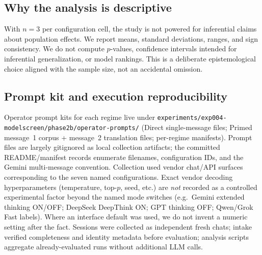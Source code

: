 \subsection{Why the analysis is descriptive}
With $n{=}3$ per configuration cell, the study is not powered for inferential claims about population effects.
We report means, standard deviations, ranges, and sign consistency.
We do not compute $p$-values, confidence intervals intended for inferential generalization, or model rankings.
This is a deliberate epistemological choice aligned with the sample size, not an accidental omission.



\subsection{Prompt kit and execution reproducibility}
Operator prompt kits for each regime live under
\texttt{experiments/exp004-modelscreen/phase2b/operator-prompts/}
(Direct single-message files; Primed message~1 corpus + message~2 translation files; per-regime manifests).
Prompt files are largely gitignored as local collection artifacts; the committed README/manifest records enumerate filenames, configuration IDs, and the Gemini multi-message convention.
Collection used vendor chat/API surfaces corresponding to the seven named configurations.
Exact vendor decoding hyperparameters (temperature, top-$p$, seed, etc.) are \emph{not} recorded as a controlled experimental factor beyond the named mode switches (e.g.\ Gemini extended thinking ON/OFF; DeepSeek DeepThink ON; GPT thinking OFF; Qwen/Grok Fast labels).
Where an interface default was used, we do not invent a numeric setting after the fact.
Sessions were collected as independent fresh chats; intake verified completeness and identity metadata before evaluation; analysis scripts aggregate already-evaluated runs without additional LLM calls.
